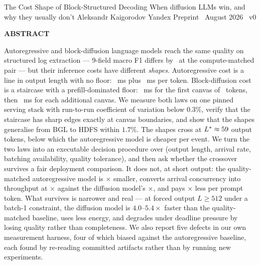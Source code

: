 \documentclass[11pt]{article}
\begin{document}
\papertitle
  {The Cost Shape of Block-Structured Decoding}
  {When diffusion LLMs win, and why they usually don't}
  {Aleksandr Kaigorodov}
  {Yandex}
  {Preprint \textperiodcentered\ August 2026 \textperiodcentered\ v0}

\begingroup
\small
\noindent
{\sffamily\bfseries\footnotesize\color{deepink}ABSTRACT}\par
\vspace{3pt}
\noindent
Autoregressive and block-diffusion language models reach the same quality on
structured log extraction --- 9-field macro F1 differs by \qualityGap\ at the
compute-matched pair --- but their inference costs have different
\emph{shapes}. Autoregressive cost is a line in output length with no floor:
\arBase~ms plus \arSlope~ms per token. Block-diffusion cost is a staircase
with a prefill-dominated floor: \dgBase~ms for the first canvas of
\canvasLength\ tokens, then \dgStep~ms for each additional canvas. We measure
both laws on one pinned serving stack with run-to-run coefficient of variation
below $0.3\%$, verify that the staircase has sharp edges exactly at canvas
boundaries, and show that the shapes generalise from BGL to HDFS within
$1.7\%$. The shapes cross at $L^{*} \approx 59$ output tokens, below
which the autoregressive model is cheaper per event. We turn the two laws into
an executable decision procedure over (output length, arrival rate, batching
availability, quality tolerance), and then ask whether the crossover survives
a fair deployment comparison. It does not, at short output: the
quality-matched autoregressive model is \footprintRatio$\times$ smaller,
converts arrival concurrency into throughput at \arBatchMult$\times$ against
the diffusion model's \dgBatchMult$\times$, and pays $\times$
less per prompt token. What survives is narrower and real --- at forced output
$L \geq 512$ under a batch-1 constraint, the diffusion model is
$4.0$--$5.4\times$ faster than the quality-matched baseline, uses less energy,
and degrades under deadline pressure by losing quality rather than
completeness. We also report five defects in our own measurement harness, four
of which biased against the autoregressive baseline, each found by re-reading
committed artifacts rather than by running new experiments.
\endgroup

\vspace{4pt}
\end{document}

